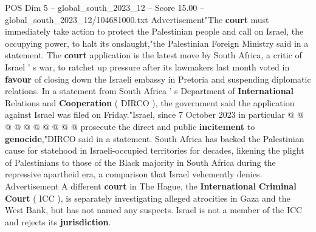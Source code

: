 \begin{textsample}{POS Dim 5 – global\_south\_2023\_12 – Score 15.00 – global\_south\_2023\_12/104681000.txt}
Advertisement"The \textbf{court} must immediately take action to protect the Palestinian people and call on Israel, the occupying power, to halt its onslaught,"the Palestinian Foreign Ministry said in a statement.
The \textbf{court} application is the latest move by South Africa, a critic of Israel ' s war, to ratchet up pressure after its lawmakers last month voted in \textbf{favour} of closing down the Israeli embassy in Pretoria and suspending diplomatic relations.
In a statement from South Africa ' s Department of \textbf{International} Relations and \textbf{Cooperation} ( DIRCO ), the government said the application against Israel was filed on Friday."Israel, since 7 October 2023 in particular @ @ @ @ @ @ @ @ @ @ prosecute the direct and public \textbf{incitement} to \textbf{genocide},"DIRCO said in a statement.
South Africa has backed the Palestinian cause for statehood in Israeli-occupied territories for decades, likening the plight of Palestinians to those of the Black majority in South Africa during the repressive apartheid era, a comparison that Israel vehemently denies.
Advertisement A different \textbf{court} in The Hague, the \textbf{International} \textbf{Criminal} \textbf{Court} ( ICC ), is separately investigating alleged atrocities in Gaza and the West Bank, but has not named any suspects.
Israel is not a member of the ICC and rejects its \textbf{jurisdiction}.

\end{textsample}
